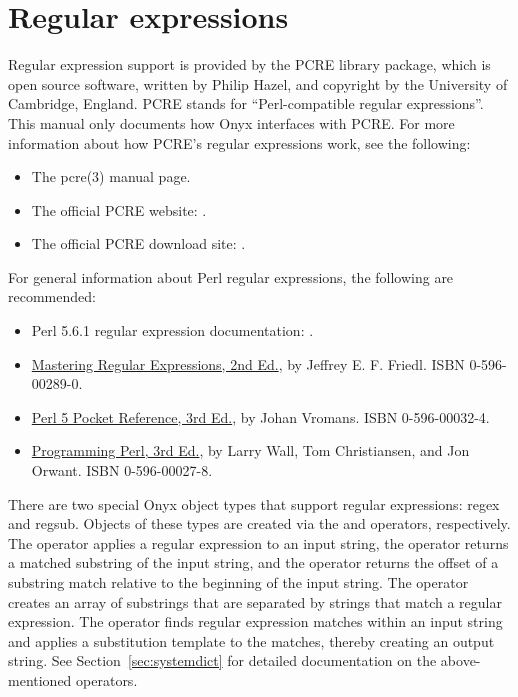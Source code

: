 \section{Regular expressions}
\label{sec:onyx_regular_expressions}

Regular expression support is provided by the PCRE library package, which is
open source software, written by Philip Hazel, and copyright by the University
of Cambridge, England.  PCRE stands for ``Perl-compatible regular
expressions''.  This manual only documents how Onyx interfaces with PCRE.  For
more information about how PCRE's regular expressions work, see the following:

\begin{itemize}
\item{The pcre(3) manual page.}
\item{The official PCRE website: .}
\item{The official PCRE download site:
.}
\end{itemize}

For general information about Perl regular expressions, the following are
recommended:

\begin{itemize}
\item{Perl 5.6.1 regular expression documentation:
.}
\item{\underline{Mastering Regular Expressions, 2nd Ed.}, by Jeffrey
E. F. Friedl.  ISBN 0-596-00289-0.}
\item{\underline{Perl 5 Pocket Reference, 3rd Ed.}, by Johan Vromans.  ISBN
0-596-00032-4.}
\item{\underline{Programming Perl, 3rd Ed.}, by Larry Wall, Tom Christiansen,
and Jon Orwant.  ISBN 0-596-00027-8.}
\end{itemize}

There are two special Onyx object types that support regular expressions: regex
and regsub.  Objects of these types are created via the
 and
 operators, respectively.  The
 operator applies a regular
expression to an input string, the
 operator returns a
matched substring of the input string, and the
 operator returns the offset
of a substring match relative to the beginning of the input string.  The
 operator creates an array of
substrings that are separated by strings that match a regular expression.  The
 operator finds regular expression
matches within an input string and applies a substitution template to the
matches, thereby creating an output string.  See Section~\ref{sec:systemdict}
for detailed documentation on the above-mentioned operators.

